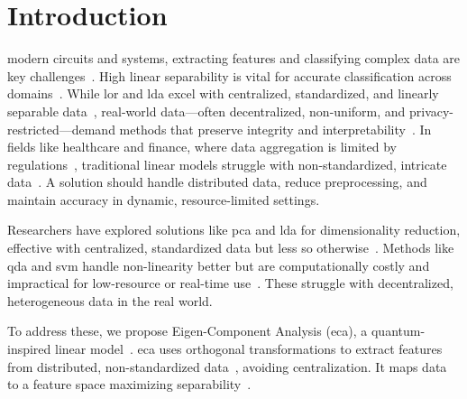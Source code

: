 \documentclass[lettersize,journal]{IEEEtran}
\begin{document}
\section{Introduction}
 modern circuits and systems, extracting features and classifying complex data are key challenges~\cite{labrinidis2012challenges}. High linear separability is vital for accurate classification across domains~\cite{hastie2009elements}. While \Gls{lor} and \Gls{lda} excel with centralized, standardized, and linearly separable data~\cite{hastie2009elements}, real-world data—often decentralized, non-uniform, and privacy-restricted—demand methods that preserve integrity and interpretability~\cite{yang2020federated,kaissis2020secure,li2021survey}. In fields like healthcare and finance, where data aggregation is limited by regulations~\cite{kaissis2020secure,li2021survey}, traditional linear models struggle with non-standardized, intricate data~\cite{singh2020investigating}. A solution should handle distributed data, reduce preprocessing, and maintain accuracy in dynamic, resource-limited settings.

Researchers have explored solutions like \Gls{pca} and \Gls{lda} for dimensionality reduction, effective with centralized, standardized data but less so otherwise~\cite{hastie2009elements}. Methods like \Gls{qda} and \Gls{svm} handle non-linearity better but are computationally costly and impractical for low-resource or real-time use~\cite{pavlov2000scaling}. These struggle with decentralized, heterogeneous data in the real world\cite{li2021survey}.

To address these, we propose Eigen-Component Analysis (\gls{eca}), a quantum-inspired linear model~\cite{chen2025eigen}. \gls{eca} uses orthogonal transformations to extract features from distributed, non-standardized data~\cite{sanchez1996use,kanjilal1995application,yen1999simplifying}, avoiding centralization. It maps data to a feature space maximizing separability~\cite{sanchez1996use,kanjilal1995application}. 
\end{document}
